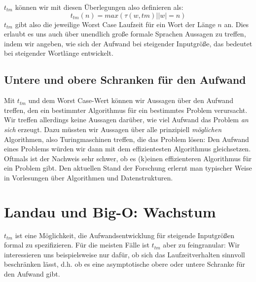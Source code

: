 $t_{tm}$ können wir mit diesen Überlegungen also definieren als:
\[
t_{tm}(n) = max({\tau(w, tm)| |w| = n})
\]
$t_{tm}$ gibt also die jeweilige Worst Case Laufzeit für ein Wort der Länge $n$ an.
Dies erlaubt es uns auch über unendlich große formale Sprachen Aussagen zu treffen,
indem wir angeben,
wie sich der Aufwand bei steigender Inputgröße,
das bedeutet bei steigender Wortlänge entwickelt.


\subsection{Untere und obere Schranken für den Aufwand}
Mit $t_{tm}$ und dem Worst Case-Wert können wir Aussagen über den Aufwand treffen,
den ein bestimmter Algorithmus für ein bestimmtes Problem verursacht.
Wir treffen allerdings keine Aussagen darüber,
wie viel Aufwand das Problem \emph{an sich} erzeugt.
Dazu müssten wir Aussagen über alle prinzipiell \emph{möglichen} Algorithmen,
also Turingmaschinen treffen,
die das Problem lösen:
Den Aufwand eines Problems würden wir dann mit dem effizientesten Algorithmus gleichsetzen.
Oftmals ist der Nachweis sehr schwer,
ob es (k)einen effizienteren Algorithmus
für ein Problem gibt.
Den aktuellen Stand der Forschung erlernt man typischer Weise in Vorlesungen über
Algorithmen und Datenstrukturen.


\section{Landau und Big-O: Wachstum}

$t_{tm}$ ist eine Möglichkeit,
die Aufwandsentwicklung für steigende Inputgrößen formal zu spezifizieren.
Für die meisten Fälle ist $t_{tm}$ aber zu feingranular:
Wir interessieren uns beispielsweise nur dafür,
ob sich das Laufzeitverhalten sinnvoll beschränken lässt,
d.h. ob es eine asymptotische obere oder untere Schranke für den Aufwand gibt.

